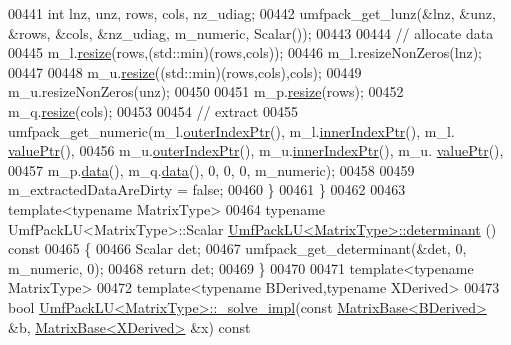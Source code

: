 \begin{DoxyCode}
00441     \textcolor{keywordtype}{int} lnz, unz, rows, cols, nz\_udiag;
00442     umfpack\_get\_lunz(&lnz, &unz, &rows, &cols, &nz\_udiag, m\_numeric, Scalar());
00443 
00444     \textcolor{comment}{// allocate data}
00445     m\_l.\hyperlink{group___sparse_core___module_af88551f30202341b7cc24cfadabdec5c}{resize}(rows,(std::min)(rows,cols));
00446     m\_l.resizeNonZeros(lnz);
00447 
00448     m\_u.\hyperlink{group___sparse_core___module_af88551f30202341b7cc24cfadabdec5c}{resize}((std::min)(rows,cols),cols);
00449     m\_u.resizeNonZeros(unz);
00450 
00451     m\_p.\hyperlink{class_eigen_1_1_plain_object_base_a99d9054ee2d5a40c6e00ded0265e9cea}{resize}(rows);
00452     m\_q.\hyperlink{class_eigen_1_1_plain_object_base_a99d9054ee2d5a40c6e00ded0265e9cea}{resize}(cols);
00453 
00454     \textcolor{comment}{// extract}
00455     umfpack\_get\_numeric(m\_l.\hyperlink{group___sparse_core___module_a75506964d86d6badb32d0b4917acf2e2}{outerIndexPtr}(), m\_l.\hyperlink{group___sparse_core___module_ae7b804bd39745156d20ca1611a296b67}{innerIndexPtr}(), m\_l.
      \hyperlink{group___sparse_core___module_a9d4354d3f4d121d764bbed33cac05329}{valuePtr}(),
00456                         m\_u.\hyperlink{group___sparse_core___module_a75506964d86d6badb32d0b4917acf2e2}{outerIndexPtr}(), m\_u.\hyperlink{group___sparse_core___module_ae7b804bd39745156d20ca1611a296b67}{innerIndexPtr}(), m\_u.
      \hyperlink{group___sparse_core___module_a9d4354d3f4d121d764bbed33cac05329}{valuePtr}(),
00457                         m\_p.\hyperlink{class_eigen_1_1_plain_object_base_ac25699535374b1854cf8494e44ad31b2}{data}(), m\_q.\hyperlink{class_eigen_1_1_plain_object_base_ac25699535374b1854cf8494e44ad31b2}{data}(), 0, 0, 0, m\_numeric);
00458 
00459     m\_extractedDataAreDirty = \textcolor{keyword}{false};
00460   \}
00461 \}
00462 
00463 \textcolor{keyword}{template}<\textcolor{keyword}{typename} MatrixType>
00464 \textcolor{keyword}{typename} UmfPackLU<MatrixType>::Scalar \hyperlink{class_eigen_1_1_umf_pack_l_u}{UmfPackLU<MatrixType>::determinant}
      ()\textcolor{keyword}{ const}
00465 \textcolor{keyword}{}\{
00466   Scalar det;
00467   umfpack\_get\_determinant(&det, 0, m\_numeric, 0);
00468   \textcolor{keywordflow}{return} det;
00469 \}
00470 
00471 \textcolor{keyword}{template}<\textcolor{keyword}{typename} MatrixType>
00472 \textcolor{keyword}{template}<\textcolor{keyword}{typename} BDerived,\textcolor{keyword}{typename} XDerived>
00473 \textcolor{keywordtype}{bool} \hyperlink{class_eigen_1_1_umf_pack_l_u}{UmfPackLU<MatrixType>::\_solve\_impl}(\textcolor{keyword}{const} 
      \hyperlink{group___core___module_class_eigen_1_1_matrix_base}{MatrixBase<BDerived>} &b, \hyperlink{group___core___module_class_eigen_1_1_matrix_base}{MatrixBase<XDerived>} &x)\textcolor{keyword}{ const}

\end{DoxyCode}
